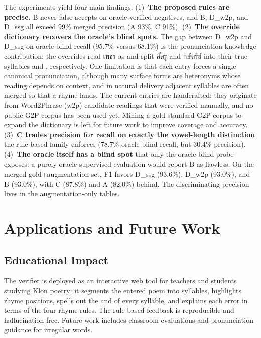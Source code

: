 \documentclass[conference]{IEEEtran}
\newcommand{\thtxt}[1]{{\thaifont #1}}      %
\newcommand{\thtxt}[1]{}
\begin{document}
The experiments yield four main findings. (1)~\textbf{The proposed rules are
precise.} B never false-accepts on oracle-verified negatives, and B,
D\_w2p, and D\_ssg all exceed 99\% merged precision (A 93\%, C 91\%).
(2)~\textbf{The override dictionary recovers the oracle's blind spots.}
The gap between D\_w2p and D\_ssg on oracle-blind recall (95.7\% versus
68.1\%) is the pronunciation-knowledge contribution: the overrides read
\thtxt{เพชร} as  and split \thtxt{ศัตรู} and \thtxt{กษัตรีย์}
into their true syllables  and ,
respectively. One limitation is that each entry forces a single
canonical pronunciation, although many surface forms are heteronyms whose
reading depends on context, and in natural delivery adjacent syllables are
often merged so that a rhyme lands. The current entries are handcrafted:
they originate from Word2Phrase (w2p) candidate readings that were
verified manually, and no public G2P corpus has been used yet. Mining a
gold-standard G2P corpus to expand the dictionary is left for future work
to improve coverage and accuracy. (3)~\textbf{C trades precision for recall
on exactly
the vowel-length distinction} the rule-based family enforces (78.7\%
oracle-blind recall, but 30.4\% precision). (4)~\textbf{The oracle itself has a blind spot} that
only the oracle-blind probe exposes: a purely oracle-supervised evaluation
would report B as flawless. On the merged gold+augmentation set, F1
favors D\_ssg (93.6\%), D\_w2p (93.0\%), and B (93.0\%), with C (87.8\%)
and A (82.0\%) behind. The discriminating precision lives in the
augmentation-only tables.


\section{Applications and Future Work}

\subsection{Educational Impact}

The verifier is deployed as an interactive web tool for teachers
and students studying Klon poetry: it segments the entered poem into syllables, highlights rhyme
positions, spells out the  and  of every syllable, and explains
each error in terms of the four rhyme rules. The rule-based
feedback is reproducible and hallucination-free. Future work includes
classroom evaluations and pronunciation guidance for irregular words.
\end{document}
